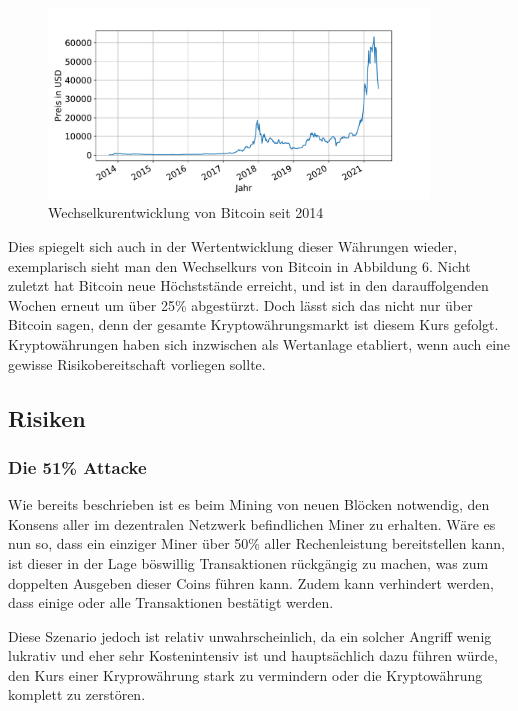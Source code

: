\documentclass[12pt,oneside]{article}
\begin{document}
\begin{figure}[h]
\centering
\includegraphics[width=0.9\textwidth]{./images/btcchart.pdf}
\caption{Wechselkurentwicklung von Bitcoin seit 2014 \cite{coindesk2021}}
\centering
\end{figure}

Dies spiegelt sich auch in der Wertentwicklung dieser Währungen wieder, exemplarisch sieht man den Wechselkurs von Bitcoin in Abbildung 6. Nicht zuletzt hat Bitcoin neue Höchststände erreicht, und ist in den darauffolgenden Wochen erneut um über 25\% abgestürzt. Doch lässt sich das nicht nur über Bitcoin sagen, denn der gesamte Kryptowährungsmarkt ist diesem Kurs gefolgt. Kryptowährungen haben sich inzwischen als Wertanlage etabliert, wenn auch eine gewisse Risikobereitschaft vorliegen sollte.\cite{coinmarketcap}
\subsection{Risiken}

\subsubsection{Die 51\% Attacke}

Wie bereits beschrieben ist es beim Mining von neuen Blöcken notwendig, den Konsens aller im dezentralen Netzwerk befindlichen Miner zu erhalten. Wäre es nun so, dass ein einziger Miner über 50\% aller Rechenleistung bereitstellen kann, ist dieser in der Lage böswillig Transaktionen rückgängig zu machen, was zum doppelten Ausgeben dieser Coins führen kann. Zudem kann verhindert werden, dass einige oder alle Transaktionen bestätigt werden. 

Diese Szenario jedoch ist relativ unwahrscheinlich, da ein solcher Angriff wenig lukrativ und eher sehr Kostenintensiv ist und hauptsächlich dazu führen würde, den Kurs einer Kryprowährung stark zu vermindern oder die Kryptowährung komplett zu zerstören. \cite{binance2020}
\end{document}
